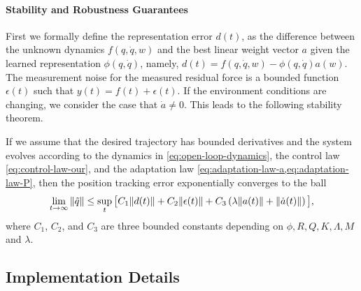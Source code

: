 \paragraph{Stability and Robustness Guarantees} 
First we formally define the representation error $d(t)$, as the difference between the unknown dynamics $f(q,\dot{q},w)$ and the best linear weight vector $a$ given the learned representation $\phi(q,\dot{q})$, namely, $d(t) = f(q,\dot{q},w) - \phi(q,\dot{q})a(w)$. The measurement noise for the measured residual force is a bounded function $\epsilon(t)$ such that $y(t) = f(t) + \epsilon(t)$. If the environment conditions are changing, we consider the case that $\dot{a}\neq 0$. This leads to the following stability theorem.
\begin{theorem}
\label{thm:stability-proof}
    If we assume that the desired trajectory has bounded derivatives and 
    the system evolves according to the dynamics in \cref{eq:open-loop-dynamics}, the control law \cref{eq:control-law-our}, and the adaptation law \cref{eq:adaptation-law-a,eq:adaptation-law-P}, then the position tracking error exponentially converges to the ball
    \begin{equation}
        \label{eq:exponential-bound}
        \lim_{t\rightarrow\infty}\|\tilde{q}\| \leq \sup_t \big[ C_1\|d(t)\| + C_2\|{\epsilon(t)}\| +  C_3\left( \lambda\|a(t)\| + \|\dot{a}(t)\|\right) \big],
    \end{equation} 
    where $C_1$, $C_2$, and $C_3$ are three bounded constants depending on $\phi, R, Q, K,\Lambda, M$ and $\lambda$.
\end{theorem}

\subsection*{Implementation Details}
\label{sec:implementation}

